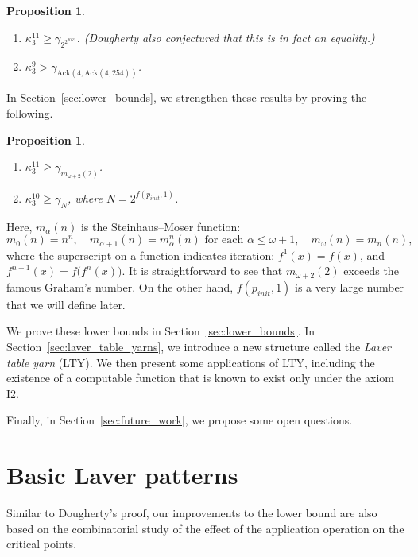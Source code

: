 \documentclass{article}
\newtheorem{proposition}[lemma]{Proposition}
\theoremstyle{definition}
\theoremstyle{remark}
\begin{document}
\begin{proposition} \ 
\begin{enumerate}
    \item \(\kappa^{11}_3 \ge \gamma_{2^{2^{2059}}}\). (Dougherty also conjectured that this is in fact an equality.)
    \item \(\kappa^9_3 > \gamma_{\mathrm{Ack}(4, \mathrm{Ack}(4, 254))}\).
\end{enumerate}
\end{proposition}

In Section~\ref{sec:lower_bounds}, we strengthen these results by proving the following.

\begin{proposition} \label{numberbound}
\ 
\begin{enumerate}
    \item \(\kappa^{11}_3 \ge \gamma_{m_{\omega+2}(2)}\).
    \item \(\kappa^{10}_3 \ge \gamma_{N}\), where \(N = 2^{f(p_{init},1)}\).
\end{enumerate}
\end{proposition}

Here, \(m_\alpha(n)\) is the Steinhaus--Moser function: 
\[
m_0(n) = n^n, 
\quad 
m_{\alpha+1}(n) = m_\alpha^n(n) \text{ for each } \alpha \le \omega+1, 
\quad 
m_\omega(n) = m_n(n),
\]
where the superscript on a function indicates iteration: \(f^1(x) = f(x)\), and \(f^{n+1}(x) = f\bigl(f^n(x)\bigr)\). It is straightforward to see that \(m_{\omega+2}(2)\) exceeds the famous Graham’s number. On the other hand, \(f(p_{init},1)\) is a very large number that we will define later.

We prove these lower bounds in Section~\ref{sec:lower_bounds}. In Section~\ref{sec:laver_table_yarns}, we introduce a new structure called the \emph{Laver table yarn} (LTY). We then present some applications of LTY, including the existence of a computable function that is known to exist only under the axiom I2.

Finally, in Section~\ref{sec:future_work}, we propose some open questions.




\section{Basic Laver patterns}
\label{sec:basic_laver_patterns}

Similar to Dougherty's proof, our improvements to the lower bound are also based on the combinatorial study of the effect of the application operation on the critical points.
\end{document}

